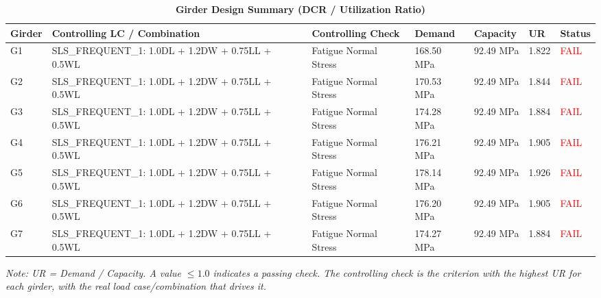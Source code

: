 \documentclass[12pt,a4paper]{report}
\numberwithin{table}{chapter}
\numberwithin{figure}{chapter}
\begin{document}
\vspace{1em}
\vspace{0.4em}
\begin{longtable}{|C{1.6cm}|>{\centering\arraybackslash}p{3.6cm}|C{2.4cm}|C{2.0cm}|C{2.1cm}|C{1.7cm}|C{1.5cm}|}
\caption{\textbf{Girder Design Summary (DCR / Utilization Ratio)}}
\hline
\textbf{Girder} & \textbf{Controlling LC / Combination} & \textbf{Controlling Check} & \textbf{Demand} & \textbf{Capacity} & \textbf{UR} & \textbf{Status} \\[6pt]
\hline
G1 & SLS\_\allowbreak{}FREQUENT\_\allowbreak{}1:\allowbreak{} 1.0DL + 1.2DW + 0.75LL + 0.5WL & Fatigue Normal Stress & 168.50 MPa & 92.49 MPa & 1.822 & \textcolor{red}{FAIL} \\[6pt]
\hline
G2 & SLS\_\allowbreak{}FREQUENT\_\allowbreak{}1:\allowbreak{} 1.0DL + 1.2DW + 0.75LL + 0.5WL & Fatigue Normal Stress & 170.53 MPa & 92.49 MPa & 1.844 & \textcolor{red}{FAIL} \\[6pt]
\hline
G3 & SLS\_\allowbreak{}FREQUENT\_\allowbreak{}1:\allowbreak{} 1.0DL + 1.2DW + 0.75LL + 0.5WL & Fatigue Normal Stress & 174.28 MPa & 92.49 MPa & 1.884 & \textcolor{red}{FAIL} \\[6pt]
\hline
G4 & SLS\_\allowbreak{}FREQUENT\_\allowbreak{}1:\allowbreak{} 1.0DL + 1.2DW + 0.75LL + 0.5WL & Fatigue Normal Stress & 176.21 MPa & 92.49 MPa & 1.905 & \textcolor{red}{FAIL} \\[6pt]
\hline
G5 & SLS\_\allowbreak{}FREQUENT\_\allowbreak{}1:\allowbreak{} 1.0DL + 1.2DW + 0.75LL + 0.5WL & Fatigue Normal Stress & 178.14 MPa & 92.49 MPa & 1.926 & \textcolor{red}{FAIL} \\[6pt]
\hline
G6 & SLS\_\allowbreak{}FREQUENT\_\allowbreak{}1:\allowbreak{} 1.0DL + 1.2DW + 0.75LL + 0.5WL & Fatigue Normal Stress & 176.20 MPa & 92.49 MPa & 1.905 & \textcolor{red}{FAIL} \\[6pt]
\hline
G7 & SLS\_\allowbreak{}FREQUENT\_\allowbreak{}1:\allowbreak{} 1.0DL + 1.2DW + 0.75LL + 0.5WL & Fatigue Normal Stress & 174.27 MPa & 92.49 MPa & 1.884 & \textcolor{red}{FAIL} \\[6pt]
\hline
\end{longtable}
\noindent\textit{Note: UR = Demand / Capacity. A value $\leq 1.0$ indicates a passing check. The controlling check is the criterion with the highest UR for each girder, with the real load case/combination that drives it.}

\vspace{1em}
\end{document}
